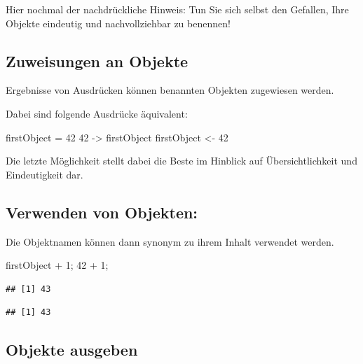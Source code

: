 \documentclass[
]{book}
\newenvironment{Shaded}{\begin{snugshade}}{\end{snugshade}}
\newcommand{\DecValTok}[1]{\textcolor[rgb]{0.00,0.00,0.81}{#1}}
\newcommand{\NormalTok}[1]{#1}
\newcommand{\OtherTok}[1]{\textcolor[rgb]{0.56,0.35,0.01}{#1}}
\newcommand{\SpecialCharTok}[1]{\textcolor[rgb]{0.00,0.00,0.00}{#1}}
\begin{document}
Hier nochmal der nachdrückliche Hinweis: Tun Sie sich selbst den Gefallen, Ihre Objekte eindeutig und nachvollziehbar zu benennen!

\hypertarget{zuweisungen-an-objekte}{%
\subsection*{Zuweisungen an Objekte}\label{zuweisungen-an-objekte}}

Ergebnisse von Ausdrücken können benannten Objekten zugewiesen werden.

Dabei sind folgende Ausdrücke äquivalent:

\begin{Shaded}
\begin{Highlighting}[]
\NormalTok{firstObject }\OtherTok{=} \DecValTok{42}
\DecValTok{42} \OtherTok{{-}\textgreater{}}\NormalTok{ firstObject}
\NormalTok{firstObject }\OtherTok{\textless{}{-}} \DecValTok{42}
\end{Highlighting}
\end{Shaded}

Die letzte Möglichkeit stellt dabei die Beste im Hinblick auf Übersichtlichkeit und Eindeutigkeit dar.

\hypertarget{verwenden-von-objekten}{%
\subsection*{Verwenden von Objekten:}\label{verwenden-von-objekten}}

Die Objektnamen können dann synonym zu ihrem Inhalt verwendet werden.

\begin{Shaded}
\begin{Highlighting}[]
\NormalTok{firstObject }\SpecialCharTok{+} \DecValTok{1}\NormalTok{; }\DecValTok{42} \SpecialCharTok{+} \DecValTok{1}\NormalTok{;}
\end{Highlighting}
\end{Shaded}

\begin{verbatim}
## [1] 43
\end{verbatim}

\begin{verbatim}
## [1] 43
\end{verbatim}

\hypertarget{objekte-ausgeben}{%
\subsection*{Objekte ausgeben}\label{objekte-ausgeben}}
\end{document}
